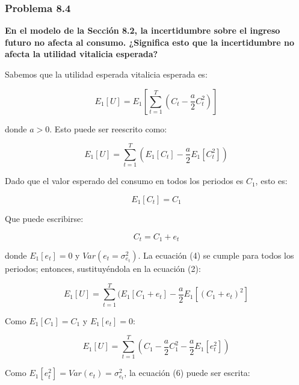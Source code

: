 \documentclass[
]{article}
\begin{document}
\hypertarget{problema-8.4}{%
\subsubsection{Problema 8.4}\label{problema-8.4}}

\textbf{En el modelo de la Sección 8.2, la incertidumbre sobre el
ingreso futuro no afecta al consumo. ¿Significa esto que la
incertidumbre no afecta la utilidad vitalicia esperada?}

Sabemos que la utilidad esperada vitalicia esperada es:

\setcounter{equation}{0}

\begin{equation}
E_{1}[U] = E_{1}[\sum_{t=1}^{T} (C_{t} - \frac{a}{2}C_{t}^2)]
\end{equation}

donde \(a > 0\). Esto puede ser reescrito como:

\begin{equation}
E_{1}[U] = \sum_{t=1}^{T}(E_{1}[C_{t}] - \frac{a}{2}E_{1}[C_{t}^{2}])
\end{equation}

Dado que el valor esperado del consumo en todos los periodos es
\(C_{1}\), esto es:

\begin{equation}
E_{1}[C_{t}]=C_{1}
\end{equation}

Que puede escribirse:

\begin{equation}
C_{t} = C_{1} + e_{t}
\end{equation}

donde \(E_{1}[e_{t}] = 0\) y \(Var(e_{t} = \sigma_{e_{t}}^2)\). La
ecuación (4) se cumple para todos los periodos; entonces, sustituyéndola
en la ecuación (2):

\begin{equation}
E_{1}[U] = \sum_{t=1}^T(E_{1}[C_{1} + e_{t}]-\frac{a}{2}E_{1}[(C_{1} + e_{t})^2]
\end{equation}

Como \(E_{1}[C_{1}] = C_{1}\) y \(E_{1}[e_{t}] = 0\):

\begin{equation}
E_{1}[U] = \sum_{t=1}^{T}(C_{1} - \frac{a}{2}C_{1}^{2} - \frac{a}{2}E_{1}[e_{t}^{2}])
\end{equation}

Como \(E_{1}[e_{t}^{2}] = Var(e_{t}) = \sigma_{e_{t}}^{2}\), la ecuación
(6) puede ser escrita:
\end{document}
